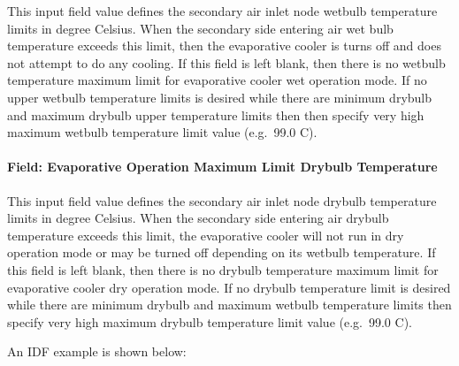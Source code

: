 This input field value defines the secondary air inlet node wetbulb temperature limits in degree Celsius. When the secondary side entering air wet bulb temperature exceeds this limit, then the evaporative cooler is turns off and does not attempt to do any cooling. If this field is left blank, then there is no wetbulb temperature maximum limit for evaporative cooler wet operation mode. If no upper wetbulb temperature limits is desired while there are minimum drybulb and maximum drybulb upper temperature limits then then specify very high maximum wetbulb temperature limit value (e.g.~99.0 C).

\paragraph{Field: Evaporative Operation Maximum Limit Drybulb Temperature}\label{field-evaporative-operation-maximum-limit-drybulb-temperature-1}

This input field value defines the secondary air inlet node drybulb temperature limits in degree Celsius. When the secondary side entering air drybulb temperature exceeds this limit, the evaporative cooler will not run in dry operation mode or may be turned off depending on its wetbulb temperature. If this field is left blank, then there is no drybulb temperature maximum limit for evaporative cooler dry operation mode. If no drybulb temperature limit is desired while there are minimum drybulb and maximum wetbulb temperature limits then specify very high maximum drybulb temperature limit value (e.g.~99.0 C).

An IDF example is shown below:

